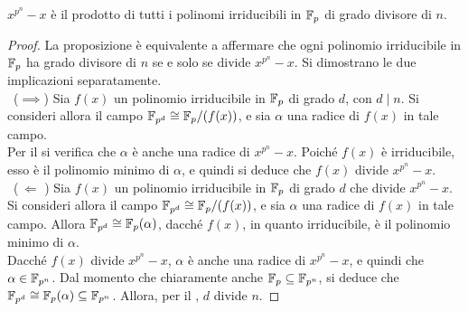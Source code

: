 \begin{theorem}
    $x^{p^n}-x$ è il prodotto di tutti i polinomi irriducibili in $\mathbb{F}_p$
    di grado divisore di $n$.
\end{theorem}

\begin{proof}
    La proposizione è equivalente a affermare che ogni polinomio irriducibile in $\mathbb{F}_p$
    ha grado divisore di $n$ se e solo se divide $x^{p^n}-x$. Si dimostrano le
    due implicazioni separatamente. \\

    \ ($\implies$)\; Sia $f(x)$ un polinomio irriducibile in $\mathbb{F}_p$ di grado $d$, con
    $d \mid n$. Si consideri allora il campo $\mathbb{F}_{p^d} \cong \mathbb{F}_p/(f(x))$, e
    sia $\alpha$ una radice di $f(x)$ in tale campo. \\

    Per il  si verifica che $\alpha$ è anche una radice
    di $x^{p^n}-x$. Poiché $f(x)$ è irriducibile, esso è il polinomio minimo
    di $\alpha$, e quindi si deduce che $f(x)$ divide $x^{p^n}-x$. \\

    \ ($\,\Longleftarrow\,\,$)\; Sia $f(x)$ un polinomio irriducibile in $\mathbb{F}_p$ di grado
    $d$ che divide $x^{p^n}-x$. Si consideri allora il campo $\mathbb{F}_{p^d} \cong \mathbb{F}_p/(f(x))$,
    e sia $\alpha$ una radice di $f(x)$ in tale campo. Allora $\mathbb{F}_{p^d} \cong
        \mathbb{F}_p(\alpha)$, dacché $f(x)$, in quanto irriducibile, è il polinomio minimo
    di $\alpha$. \\

    Dacché $f(x)$ divide $x^{p^n}-x$, $\alpha$ è anche una radice
    di $x^{p^n}-x$, e quindi che $\alpha \in \mathbb{F}_{p^n}$. Dal momento che chiaramente
    anche $\mathbb{F}_p \subseteq \mathbb{F}_{p^n}$, si deduce che $\mathbb{F}_{p^d} \cong \mathbb{F}_p(\alpha) \subseteq
        \mathbb{F}_{p^n}$. Allora, per il , $d$ divide $n$.
\end{proof}